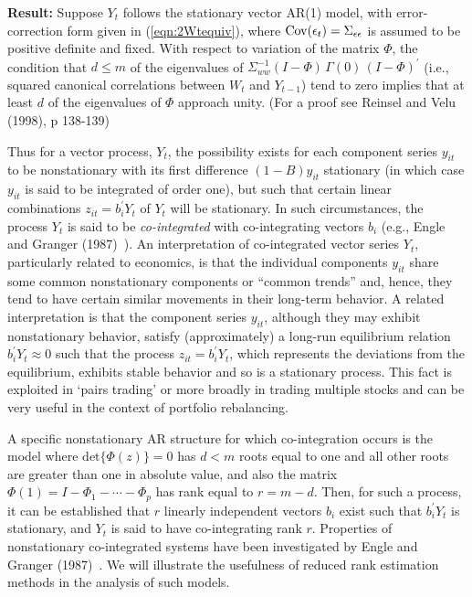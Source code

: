 \noindent\textbf{Result:}  Suppose $Y_t$ follows the stationary vector AR(1) model, with error-correction form given in (\ref{eqn:2Wtequiv}), where $\operatorname{Cov}(\epsilon_t) = \Sigma_{\epsilon \epsilon}$ is assumed to be positive definite and fixed. With respect to variation of the matrix $\Phi$, the condition that $d \leq m$ of the eigenvalues of $\Sigma_{ww}^{-1} (I- \Phi )\, \Gamma (0) \,(I- \Phi )^{\prime} $ (i.e., squared canonical correlations between $W_t$ and $Y_{t-1}$) tend to zero implies that at least $d$ of the eigenvalues of $\Phi$ approach unity. (For a proof see Reinsel and Velu (1998), p 138-139)~\cite{velurein}


Thus for a vector process, $Y_t$, the possibility exists for each component series $y_{it}$ to be nonstationary with its first difference $(1 - B) y_{it}$ stationary (in which case $y_{it}$ is said to be integrated of order one), but such that certain linear combinations $z_{it} = b_i^{\prime} Y_t $ of $Y_t$
will be stationary.  In such circumstances, the process $Y_t$ is said to be \textit{co-integrated} with co-integrating vectors $b_i$ (e.g., Engle and Granger (1987)~\cite{engle1987co}).  An interpretation of co-integrated vector series $Y_t$, particularly related to economics, is that the individual components $y_{it}$ share some common nonstationary components or ``common trends'' and, hence, they tend to have certain similar movements in their long-term behavior.  A related interpretation is that the component series $y_{it}$, although they may exhibit nonstationary behavior, satisfy (approximately) a long-run equilibrium relation $b_i^{\prime} Y_t \approx 0$ such that the process $z_{it} = b_i^{\prime} Y_t$, which represents the deviations from the equilibrium, exhibits stable behavior and so is a stationary process. This fact is exploited in `pairs trading' or more broadly in trading multiple stocks and can be very useful in the context of portfolio rebalancing. 


A specific nonstationary AR structure for which co-integration occurs is the model where $\mbox{det} \{ \Phi (z) \} = 0$ has $d < m$ roots equal to one and all other roots are greater than one in absolute value, and also the matrix $\Phi (1) = I - \Phi_1 - \cdots - \Phi_p$ has rank equal to $r = m - d$.  Then, for such a process, it can be established that $r$ linearly independent vectors $b_i$ exist such that $b_i^{\prime} Y_t$ is stationary, and $Y_t$ is said to have co-integrating rank $r$.  Properties of nonstationary co-integrated systems have been investigated by Engle and Granger (1987)~\cite{engle1987co}. We will illustrate the usefulness of reduced rank estimation methods in the analysis of such models.


